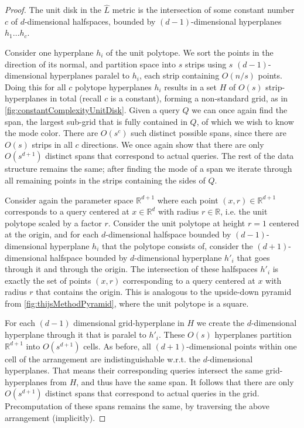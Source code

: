\documentclass[twoside,leqno,twocolumn]{article}
\newcommand{\R} {\mathbb{R}\xspace}
\begin{document}
\begin{proof}
  The unit disk in the $\hat{L}$ metric is the intersection of some constant
  number $c$ of $d$-dimensional halfspaces, bounded by
  $(d-1)$-dimensional hyperplanes $h_1 \ldots h_c$.

  Consider one hyperplane $h_i$ of the unit polytope. We sort the points in the direction of its normal, and partition space into $s$ strips using $s$ $(d-1)$-dimensional hyperplanes paralel to $h_i$, each strip containing $O(n/s)$ points. Doing this for all $c$ polytope hyperplanes $h_i$ results in a set $H$ of $O(s)$ strip-hyperplanes in total (recall $c$ is a constant), forming a non-standard grid, as in \cref{fig:constantComplexityUnitDisk}. Given a query $Q$ we can once again find the span, the largest sub-grid that is fully contained in $Q$, of which we wish to know the mode color. There are $O(s^c)$ such distinct possible spans, since there are $O(s)$ strips in all $c$ directions. We once again show that there are only $O(s^{d+1})$ distinct spans that correspond to actual queries. The rest of the data structure remains the same; after finding the mode of a span we iterate through all remaining points in the strips containing the sides of $Q$.

  Consider again the parameter space $\R^{d+1}$ where each point $(x,r) \in \R^{d+1}$ corresponds to a query centered at $x \in \R^d$ with radius $r \in \R$, i.e. the unit polytope scaled by a factor $r$. Consider the unit polytope at height $r=1$ centered at the origin, and for each $d$-dimensional halfspace bounded by $(d-1)$-dimensional hyperplane $h_i$ that the polytope consists of, consider the $(d+1)$-dimensional halfspace bounded by $d$-dimensional hyperplane $h'_i$ that goes through it and through the origin. The intersection of these halfspaces $h'_i$ is exactly the set of points $(x,r)$ corresponding to a query centered at $x$ with radius $r$ that contains the origin. This is analogous to the upside-down pyramid from \cref{fig:thijsMethodPyramid}, where the unit polytope is a square.

  For each $(d-1)$ dimensional grid-hyperplane in $H$ we create the $d$-dimensional hyperplane through it that is paralel to $h'_i$. These $O(s)$ hyperplanes partition $\R^{d+1}$ into $O(s^{d+1})$ cells. As before, all $(d+1)$-dimensional points within one cell of the arrangement are indistinguishable w.r.t. the $d$-dimensional hyperplanes. That means their corresponding queries intersect the same grid-hyperplanes from $H$, and thus have the same span.  It follows that there are only $O(s^{d+1})$ distinct spans that correspond to actual queries in the grid. Precomputation of these spans remains the same, by traversing the above arrangement (implicitly).
\end{proof}
\end{document}
